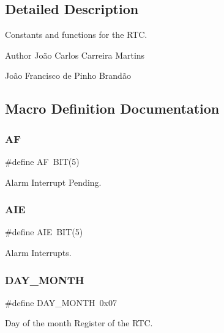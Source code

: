 \subsection{Detailed Description}
Constants and functions for the R\+TC.

\begin{DoxyAuthor}{Author}
João Carlos Carreira Martins 

João Francisco de Pinho Brandão 
\end{DoxyAuthor}


\subsection{Macro Definition Documentation}
\mbox{\label{group__rtc_ga76ba789cde9c36cd57dbb390bdee7661}} 
\subsubsection{\texorpdfstring{AF}{AF}}
{\footnotesize\ttfamily \#define AF~B\+IT(5)}



Alarm Interrupt Pending. 

\mbox{\label{group__rtc_ga113847820d539c6a6836993b84d22800}} 
\subsubsection{\texorpdfstring{A\+IE}{AIE}}
{\footnotesize\ttfamily \#define A\+IE~B\+IT(5)}



Alarm Interrupts. 

\mbox{\label{group__rtc_gaa652d6d52e8e86bfd3659f873c87a340}} 
\subsubsection{\texorpdfstring{D\+A\+Y\+\_\+\+M\+O\+N\+TH}{DAY\_MONTH}}
{\footnotesize\ttfamily \#define D\+A\+Y\+\_\+\+M\+O\+N\+TH~0x07}



Day of the month Register of the R\+TC. 

